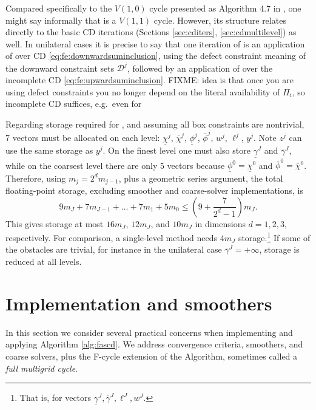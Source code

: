 \documentclass[letterpaper,final,12pt,reqno]{amsart}
\theoremstyle{cstyle}
\theoremstyle{cstyle*}
\theoremstyle{dstyle}
\numberwithin{equation}{section}
\numberwithin{figure}{section}
\numberwithin{table}{section}
\numberwithin{theorem}{section}
\begin{document}
Compared specifically to the $V(1,0)$ cycle presented as Algorithm 4.7 in \cite{GraeserKornhuber2009}, one might say informally that  is a $V(1,1)$ cycle.  However, its structure relates directly to the basic CD iterations (Sections \ref{sec:cditers}, \ref{sec:cdmultilevel}) as well.  In unilateral cases it is precise to say that one iteration of  is an application of  over CD \eqref{eq:fe:downwardsuminclusion}, using the defect constraint meaning of the downward constraint sets $\mathcal{D}^j$, followed by an application of  over the incomplete CD \eqref{eq:fe:upwardsuminclusion}.  FIXME: idea is that once you are using defect constraints you no longer depend on the literal availability of $\Pi_i$, so incomplete CD suffices, e.g.~even for 

Regarding storage required for , and assuming all box constraints are nontrivial, 7 vectors must be allocated on each level: $\underline{\chi}^j$, $\overline{\chi}^j$, $\underline{\phi}^j$, $\overline{\phi}^j$, $w^j$, $\ell^j$, $y^j$.  Note $z^j$ can use the same storage as $y^j$.  On the finest level one must also store $\underline{\gamma}^J$ and $\overline{\gamma}^J$, while on the coarsest level there are only 5 vectors because $\underline{\phi}^0=\underline{\chi}^0$ and $\overline{\phi}^0=\overline{\chi}^0$.  Therefore, using $m_j=2^d m_{j-1}$, plus a geometric series argument, the total floating-point storage, excluding smoother and coarse-solver implementations, is
\begin{equation}
9 m_J + 7 m_{J-1} + \dots + 7 m_1 + 5 m_0 \le \left(9 + \frac{7}{2^d - 1}\right) m_J.
\end{equation}
This gives storage at most $16m_J$, $12m_J$, and $10m_J$ in dimensions $d=1,2,3$, respectively.  For comparison, a single-level method needs $4 m_J$ storage.\footnote{That is, for vectors $\underline{\gamma}^J,\overline{\gamma}^J,\ell^J,w^J$.}  If some of the obstacles are trivial, for instance in the unilateral case $\overline{\gamma}^J=+\infty$, storage is reduced at all levels.


\section{Implementation and smoothers} \label{sec:implementation}

In this section we consider several practical concerns when implementing and applying  Algorithm \ref{alg:fascd}.  We address convergence criteria, smoothers, and coarse solvers, plus the F-cycle extension of the Algorithm, sometimes called a \emph{full multigrid cycle}.
\end{document}
